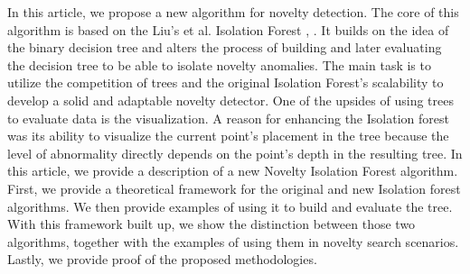 In this article, we propose a new algorithm for novelty detection.
The core of this algorithm is based on the Liu's et al. Isolation Forest \cite{liu2008isolation}, \cite{liu2012isolation}.
It builds on the idea of the binary decision tree and alters the process of building and later evaluating the decision tree to be able to isolate novelty anomalies.
The main task is to utilize the competition of trees and the original Isolation Forest's scalability to develop a solid and adaptable novelty detector. One of the upsides of using trees to evaluate data is the visualization. A reason for enhancing the Isolation forest was its ability to visualize the current point's placement in the tree because the level of abnormality directly depends on the point's depth in the resulting tree.
In this article, we provide a description of a new Novelty Isolation Forest algorithm.
First, we provide a theoretical framework for the original and new Isolation forest algorithms.
We then provide examples of using it to build and evaluate the tree.
With this framework built up, we show the distinction between those two algorithms, together with the examples of using them in novelty search scenarios.
Lastly, we provide proof of the proposed methodologies.


